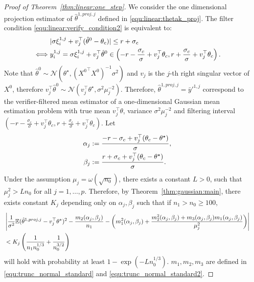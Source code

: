 \begin{proof}[Proof of Theorem~\ref{thm:linear:one_step}]

We consider the one dimensional projection estimator of $\hat{\theta}^{1,proj,j}$ defined in \eqref{equ:linear:thetak_proj}.
The filter condition \eqref{equ:linear:verify_condition2} is equivalent to:
\begin{align}
     &|\sigma\xi^{1,j}_i + v_j^\top(\hat{\theta}^0 - \theta_c)| \leq r + \sigma_c\notag\\
\iff & y^{1,j}_i = \sigma\xi^{1,j}_i + v_j^\top\hat{\theta}^0 \in \left(-r-\frac{\sigma_c}{\sigma} + v_j^\top\theta_c,r + \frac{\sigma_c}{\sigma} + v_j^\top\theta_c\right).  \label{equ:linear:interval}
\end{align}
Note that $\hat{\theta}^0 \sim \mathcal{N}(\theta^\star,({X^{0}}^\top X^0)^{-1}\sigma^2)$ and $v_j$ is the $j$-th right singular vector of $X^0$, therefore $v_j^\top \hat{\theta}^0 \sim \mathcal{N}(v_j^\top \theta^\star, \sigma^2\mu^{-2}_j)$.
Therefore, $\hat{\theta}^{1,proj,j} = \bar{y}'^{1,j}$ correspond to the verifier-filtered mean estimator of a one-dimensional Gaussian mean estimation problem with true mean $v_j^\top \theta$, variance $\sigma^2\mu^{-2}_j$ and filtering interval $\left(-r-\frac{\sigma_c}{\sigma} + v_j^\top\theta_c,r + \frac{\sigma_c}{\sigma} + v_j^\top\theta_c\right)$.
Let
\begin{align}
     \alpha_j &:= \frac{-r-\sigma_c + v_j^\top(\theta_c-\theta^\star)}{\sigma}, \notag\\
     \beta_j &:= \frac{r+\sigma_c+ v_j^\top(\theta_c-\theta^\star)}{\sigma}. \label{equ:linear:alpha_beta_j}
\end{align}
Under the assumption $\mu_j = \omega(\sqrt{n_0})$, there exists a constant $L>0$, such that $\mu^2_j > L n_0$ for all $j=1, \ldots, p$.
Therefore, by Theorem~\ref{thm:gaussian:main}, there exists constant $K_j$ depending only on $\alpha_j,\beta_j$ such that if $n_1 > n_0 \geq 100$,
\begin{align}
     &\left| \frac{1}{\sigma^2}\mathbb{E}(\hat{\theta}^{1,proj,j}-v_j^{\top}\theta^\star)^2 - \frac{m_2(\alpha_j,\beta_j)}{n_1}- \bigg(m_1^2(\alpha_j,\beta_j) + \frac{m^2_2(\alpha_j,\beta_j)+m_3(\alpha_j,\beta_j)m_1(\alpha_j,\beta_j)}{\mu^2_j}\bigg) \right| \notag\\
     & < K_j\left(\frac{1}{n_1n^{1/3}_0}+\frac{1}{n^{3/2}_0}\right)\label{equ:linear:bound_j}
\end{align}
will hold with probability at least $1-\exp(-Ln_0^{1/3})$. $m_1,m_2,m_3$ are defined in \eqref{equ:trunc_normal_standard} and \eqref{equ:trunc_normal_standard2}.

\end{proof}
